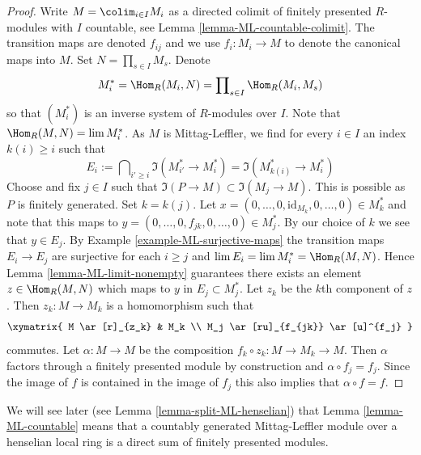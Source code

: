 \begin{proof}
Write $M = \colim_{i \in I} M_i$ as a directed colimit of finitely
presented $R$-modules with $I$ countable, see
Lemma \ref{lemma-ML-countable-colimit}.
The transition maps are denoted $f_{ij}$ and we use $f_i : M_i \to M$
to denote the canonical maps into $M$. Set $N = \prod_{s \in I} M_s$. Denote
$$
M_i^* = \Hom_R(M_i, N) = \prod\nolimits_{s \in I} \Hom_R(M_i, M_s)
$$
so that $(M_i^*)$ is an inverse system of $R$-modules over $I$.
Note that $\Hom_R(M, N) = \lim M_i^*$.
As $M$ is Mittag-Leffler, we find for every
$i \in I$ an index $k(i) \geq i$ such that
$$
E_i := \bigcap\nolimits_{i' \geq i} \Im(M_{i'}^* \to M_i^*)
=
\Im(M_{k(i)}^* \to M_i^*)
$$
Choose and fix $j \in I$ such that $\Im(P \to M) \subset \Im(M_j \to M)$.
This is possible as $P$ is finitely generated. Set $k = k(j)$.
Let
$x = (0, \ldots, 0, \text{id}_{M_k}, 0, \ldots, 0) \in M_k^*$ and
note that this maps to $y = (0, \ldots, 0, f_{jk}, 0, \ldots, 0) \in M_j^*$.
By our choice of $k$ we see that $y \in E_j$. By
Example \ref{example-ML-surjective-maps}
the transition maps $E_i \to E_j$ are surjective for each $i \geq j$
and $\lim E_i = \lim M_i^* = \Hom_R(M, N)$. Hence
Lemma \ref{lemma-ML-limit-nonempty}
guarantees there exists an element $z \in \Hom_R(M, N)$
which maps to $y$ in $E_j \subset M_j^*$. Let $z_k$ be the $k$th component
of $z$. Then $z_k : M \to M_k$ is a homomorphism such that
$$
\xymatrix{
M \ar[r]_{z_k} & M_k \\
M_j \ar[ru]_{f_{jk}} \ar[u]^{f_j}
}
$$
commutes. Let $\alpha : M \to M$ be the composition
$f_k \circ z_k : M \to M_k \to M$.
Then $\alpha$ factors through a finitely presented module by construction and
$\alpha \circ f_j = f_j$. Since the image of $f$ is contained in the image of
$f_j$ this also implies that $\alpha \circ f = f$.
\end{proof}

\noindent
We will see later (see
Lemma \ref{lemma-split-ML-henselian})
that
Lemma \ref{lemma-ML-countable}
means that a countably generated Mittag-Leffler module over a henselian local
ring is a direct sum of finitely presented modules.




